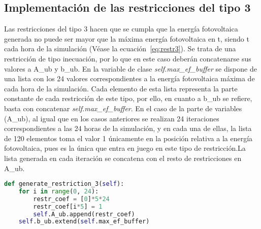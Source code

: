\subsection{Implementación de las restricciones del tipo 3}
Las restricciones del tipo 3 hacen que se cumpla que la energía fotovoltaica generada no puede ser mayor que la máxima energía fotovoltaica en t, siendo t cada hora de la simulación (Véase la ecuación~\ref{eq:restr3}). Se trata de una restricción de tipo inecuación, por lo que en este caso deberán concatenarse sus valores a A\_ub y b\_ub. En la variable de clase \textit{self.max\_ef\_buffer} se dispone de una lista con los 24 valores correspondientes a la energía fotovoltaica máxima de cada hora de la simulación. Cada elemento de esta lista representa la parte constante de cada restricción de este tipo, por ello, en cuanto a b\_ub se refiere, basta con concatenar \textit{self.max\_ef\_buffer}. En el caso de la parte de variables (A\_ub), al igual que en los casos anteriores se realizan 24 iteraciones correspondientes a las 24 horas de la simulación, y en cada una de ellas, la lista de 120 elementos toma el valor 1 únicamente en la posición relativa a la energía fotovoltaica, pues es la única que entra en juego en este tipo de restricción.La lista generada en cada iteración se concatena con el resto de restricciones en A\_ub.
\begin{lstlisting}[language=Python,float=ht,caption={Restricciones del tipo 3},label={lst:restr3}]
def generate_restriction_3(self):
    for i in range(0, 24):
        restr_coef = [0]*5*24
        restr_coef[i*5] = 1
        self.A_ub.append(restr_coef)
    self.b_ub.extend(self.max_ef_buffer)
\end{lstlisting}
